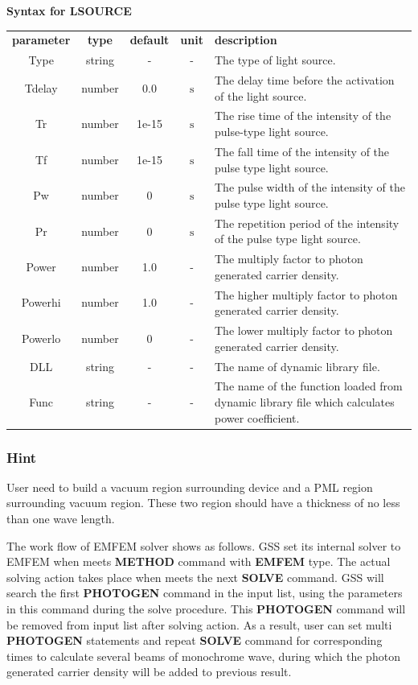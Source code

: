 \documentclass[11pt,pdftex]{article}
\begin{document}
\textbf{Syntax for LSOURCE}
\small \noindent\begin{longtable}{ccccp{8cm}}
\textbf{ parameter}   & \textbf{type}         & \textbf{default} & \textbf{unit} & \textbf{description} \\
Type   & string  & -     & -                             & The type of light source.\\
Tdelay & number  & 0.0   & $\mathrm{s}$                  & The delay time before the activation of the light source. \\
Tr     & number  & 1e-15 & $\mathrm{s}$                  & The rise time of the intensity of the pulse-type light source. \\
Tf     & number  & 1e-15 & $\mathrm{s}$                  & The fall time of the intensity of the pulse type light source. \\
Pw     & number  & 0     & $\mathrm{s}$                  & The pulse width of the intensity of the pulse type light source. \\
Pr     & number  & 0     & $\mathrm{s}$                  & The repetition period of the intensity of the pulse type light source. \\
Power  & number  & 1.0   & -                             & The multiply factor to photon generated carrier density.\\
Powerhi& number  & 1.0   & -                             & The higher multiply factor to photon generated carrier density. \\
Powerlo& number  & 0     & -                             & The lower multiply factor to photon generated carrier density. \\
DLL    & string  & -  & -                                & The name of dynamic library file.\\
Func   & string  & -  & -                                & The name of the function loaded from dynamic library file which calculates power coefficient.\\
\end{longtable}
\normalsize

\subsubsection*{Hint}
User need to build a vacuum region surrounding device and a PML
region surrounding vacuum region. These two region should have a
thickness of no less than one wave length.

The work flow of EMFEM solver shows as follows. GSS set its internal
solver to EMFEM when meets \textbf{METHOD} command with
\textbf{EMFEM} type. The actual solving action takes place when
meets the next \textbf{SOLVE} command. GSS will search the first
\textbf{PHOTOGEN} command in the input list, using the parameters in
this command during the solve procedure. This \textbf{PHOTOGEN}
command will be removed from input list after solving action. As a
result, user can set multi \textbf{PHOTOGEN} statements and repeat
\textbf{SOLVE} command for corresponding times to calculate several
beams of monochrome wave, during which the photon generated carrier
density will be added to previous result.
\end{document}
